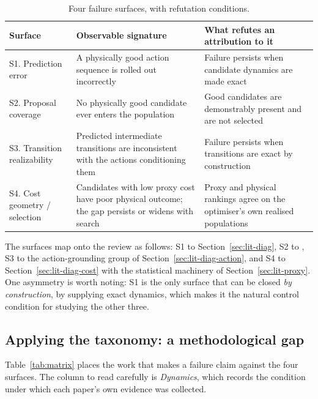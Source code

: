 \documentclass[11pt,letterpaper]{article}
\begin{document}
\begin{table}[t]
\centering\small
\caption{Four failure surfaces, with refutation conditions.}\label{tab:surfaces}
\begin{tabularx}{\textwidth}{@{}L{2.5cm} L{4.0cm} Y@{}}
\toprule
Surface & Observable signature & What refutes an attribution to it \\
\midrule
S1. Prediction error & A physically good action sequence is rolled out
incorrectly & Failure persists when candidate dynamics are made exact \\
S2. Proposal coverage & No physically good candidate ever enters the population &
Good candidates are demonstrably present and are not selected \\
S3. Transition realizability & Predicted intermediate transitions are inconsistent
with the actions conditioning them & Failure persists when transitions are exact
by construction \\
S4. Cost geometry / selection & Candidates with low proxy cost have poor physical
outcome; the gap persists or widens with search & Proxy and physical rankings
agree on the optimiser's own realised populations \\
\bottomrule
\end{tabularx}
\end{table}

The surfaces map onto the review as follows: S1 to
Section~\ref{sec:lit-diag}, S2 to \citet{imwm2026}, S3 to the
action-grounding group of Section~\ref{sec:lit-diag-action}, and S4 to
Section~\ref{sec:lit-diag-cost} with the statistical machinery of
Section~\ref{sec:lit-proxy}. One asymmetry is worth noting: S1 is the only
surface that can be closed \emph{by construction}, by supplying exact dynamics,
which makes it the natural control condition for studying the other three.

\subsection{Applying the taxonomy: a methodological gap}

Table~\ref{tab:matrix} places the work that makes a failure claim against the
four surfaces. The column to read carefully is \emph{Dynamics}, which records the
condition under which each paper's own evidence was collected.
\end{document}
